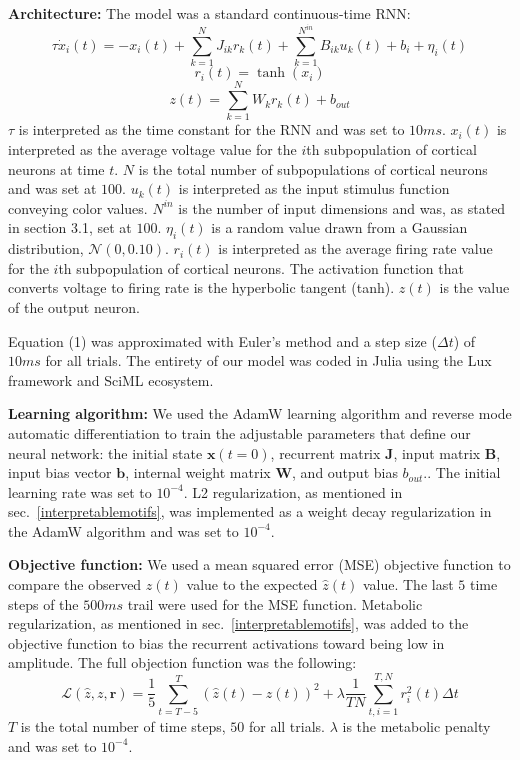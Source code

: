 \documentclass[conference]{IEEEtran}
\begin{document}
\textbf{Architecture:} The model was a standard continuous-time RNN:
\begin{equation}
    \tau \dot{x}_i(t) = -x_i(t) + \sum^{N}_{k=1} J_{ik}r_k(t) + \sum^{N^{in}}_{k=1}B_{ik}u_k(t) + b_i + \eta_i(t)
\end{equation}
\begin{equation}
    r_i(t) = \tanh(x_i)
\end{equation}
\begin{equation}
    z(t) = \sum^{N}_{k=1}W_{k}r_k(t) + b_{out}
\end{equation}
$\tau$ is interpreted as the time constant for the RNN and was set to $10 ms$. $x_i(t)$ is interpreted as the average voltage value for the $i$th subpopulation of cortical neurons at time $t$. $N$ is the total number of subpopulations of cortical neurons and was set at $100$. $u_k(t)$ is interpreted as the input stimulus function conveying color values. $N^{in}$ is the number of input dimensions and was, as stated in section 3.1, set at $100$. $\eta_i(t)$ is a random value drawn from a Gaussian distribution, $\mathcal{N}(0,0.10)$. $r_i(t)$ is interpreted as the average firing rate value for the $i$th subpopulation of cortical neurons. The activation function that converts voltage to firing rate is the hyperbolic tangent (tanh). $z(t)$ is the value of the output neuron.

Equation (1) was approximated with Euler's method and a step size ($\Delta t$) of $10 ms$ for all trials. The entirety of our model was coded in Julia\cite{bezanson2017julia} using the Lux framework\cite{pal2022lux} and SciML ecosystem\cite{rackauckas2017differentialequations,rackauckas2020universal}.

\textbf{Learning algorithm:} We used the AdamW learning algorithm\cite{loshchilov2017decoupled} and reverse mode automatic differentiation to train the adjustable parameters that define our neural network: the initial state $\textbf{x}(t=0)$, recurrent matrix $\textbf{J}$, input matrix $\textbf{B}$, input bias vector $\textbf{b}$, internal weight matrix $\textbf{W}$, and output bias $b_{out}$.. The initial learning rate was set to $10^{-4}$. L2 regularization, as mentioned in sec.~\ref{interpretablemotifs}, was implemented as a weight decay regularization in the AdamW algorithm and was set to $10^{-4}$.

\textbf{Objective function:} We used a mean squared error (MSE) objective function to compare the observed $z(t)$ value to the expected $\hat{z}(t)$ value. The last $5$ time steps of the $500 ms$ trail were used for the MSE function. Metabolic regularization, as mentioned in sec.~\ref{interpretablemotifs}, was added to the objective function to bias the recurrent activations toward being low in amplitude. The full objection function was the following:
\begin{equation}
    \mathcal{L}(\hat{z},z,\textbf{r}) = \frac{1}{5}\sum_{t=T-5}^{T}(\hat{z}(t)-z(t))^2 + \lambda\frac{1}{TN} \sum_{t,i=1}^{T,N} r^2_i(t)\Delta t
\end{equation}
$T$ is the total number of time steps, $50$ for all trials. $\lambda$ is the metabolic penalty and was set to $10^{-4}$.
\end{document}
